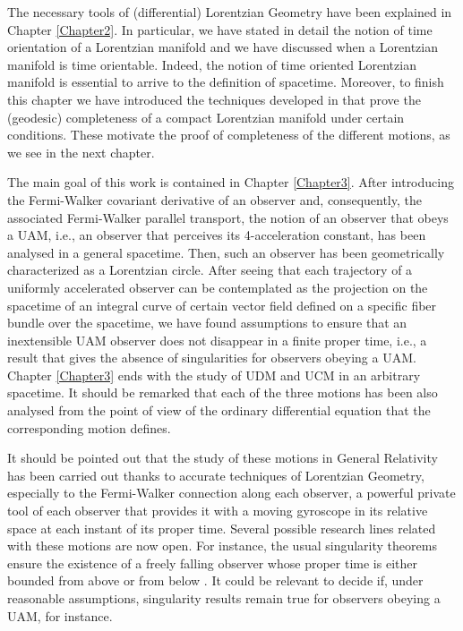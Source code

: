 \documentclass[11pt]{book}
\begin{document}
The necessary tools of (differential) Lorentzian Geometry have been explained in Chapter \ref{Chapter2}. In particular, we have stated in detail the notion of time orientation of a Lorentzian manifold and we have discussed when a Lorentzian manifold is time orientable. Indeed, the notion of time oriented Lorentzian manifold is essential to arrive to the definition of spacetime. Moreover, to finish this chapter we have introduced the techniques developed in \cite{RS} that prove the (geodesic) completeness of a compact Lorentzian manifold under certain conditions. These motivate the proof of completeness of the different motions, as we see in the next chapter.

The main goal of this work is contained in Chapter \ref{Chapter3}. After introducing the Fermi-Walker covariant derivative of an observer and, consequently, the associated Fermi-Walker parallel transport, the notion of an observer that obeys a UAM, i.e., an observer that perceives its 4-acceleration constant, has been analysed in a general spacetime. Then, such an observer has been geometrically characterized as a Lorentzian circle. After seeing that each trajectory of a uniformly accelerated observer can be contemplated as the projection on the spacetime of an integral curve of certain vector field defined on a specific fiber bundle over the spacetime, we have found assumptions to ensure that an inextensible UAM observer does not disappear in a finite proper time, i.e., a result that gives the absence of singularities for observers obeying a UAM. Chapter \ref{Chapter3} ends with the study of UDM and UCM in an arbitrary spacetime. It should be remarked that each of the three motions has been also analysed from the point of view of the ordinary differential equation that the corresponding motion defines.         

It should be pointed out that the study of these motions in General Relativity has been carried out thanks to accurate techniques of Lorentzian Geometry, especially to the Fermi-Walker connection along each observer, a powerful private tool of each observer that provides it with a moving gyroscope in its relative space at each instant of its proper time. Several possible research lines related with these motions are now open. For instance, the usual singularity theorems ensure the existence of a freely falling observer whose proper time is either bounded from above or from below \cite{SW2}. It could be relevant to decide if, under reasonable assumptions, singularity results remain true for observers obeying a UAM, for instance.      
\end{document}
